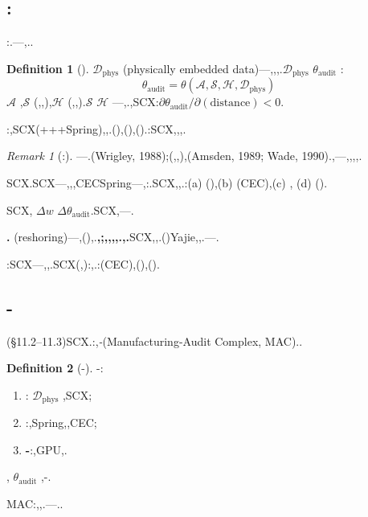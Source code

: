 \documentclass[12pt,a4paper]{article}
\theoremstyle{definition}
\newtheorem{definition}{Definition}[section]
\theoremstyle{remark}
\newtheorem{remark}{Remark}[section]
\begin{document}
\subsection{:}

:.---,.\textit{}.

\begin{definition}[]
 $\mathcal{D}_{\text{phys}}$ (physically embedded data)---,,,.$\mathcal{D}_{\text{phys}}$  $\theta_{\text{audit}}$ :
\begin{equation}
\theta_{\text{audit}} = \theta\left( \mathcal{A}, \mathcal{S}, \mathcal{H}, \mathcal{D}_{\text{phys}} \right)
\end{equation}
 $\mathcal{A}$ ,$\mathcal{S}$ (,,),$\mathcal{H}$ (,,).$\mathcal{S}$  $\mathcal{H}$ ---,.,SCX\textit{}:$\partial \theta_{\text{audit}} / \partial (\text{distance}) < 0$.
\end{definition}

:,SCX(+++Spring),,.(),(),().:SCX,,,.

\begin{remark}[:]
---.(Wrigley, 1988);(,,),(Amsden, 1989; Wade, 1990).,---,,,,.

SCX.SCX---,,,CECSpring---,:.SCX,,.:(a) (),(b) (CEC),(c) , (d) ().

SCX, $\Delta w$  $\Delta \theta_{\text{audit}}$.SCX,---.
\end{remark}

\textbf{.} (reshoring)---,(),.\textbf{,;,,,,.,.}SCX,,.()Yajie,,.---.

:SCX---,,.SCX(,):,\textit{}.:(CEC),(),().

\subsection{-}

(§11.2–11.3)SCX.:,\textit{-}(Manufacturing-Audit Complex, MAC)..

\begin{definition}[-]
-:
\begin{enumerate}[label=(\roman*)]
    \item \textbf{}: $\mathcal{D}_{\text{phys}}$ ,SCX;
    \item \textbf{}:,Spring,,CEC;
    \item \textbf{-}:,GPU,.
\end{enumerate}
, $\theta_{\text{audit}}$ ,-.
\end{definition}

MAC\textit{}:,,.---..

\subsubsection*{}
\end{document}
